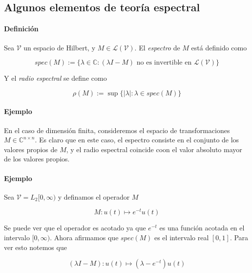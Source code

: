 \subsection{Algunos elementos de teoría espectral}

\paragraph{Definición} Sea $\mathcal{V}$ un espacio de Hilbert, y $M \in \mathcal{L} (\mathcal{V})$. El \textit{espectro} de $M$ está definido como

\begin{equation*}
    spec(M) := \{\lambda \in \mathbb{C} : (\lambda I - M) \text{ no es invertible en } \mathcal{L} (\mathcal{V}) \}
\end{equation*}

Y el \textit{radio espectral} se define como

\begin{equation*}
    \rho (M) := \sup \{ |\lambda | : \lambda \in spec(M) \}
\end{equation*}

\paragraph{Ejemplo} En el caso de dimensión finita, consideremos el espacio de transformaciones $M \in \mathbb{C}^{n \times n}$. Es claro que en este caso, el espectro consiste en el conjunto de los valores propios de $M$, y el radio espectral coincide coon el valor absoluto mayor de los valores propios.


\paragraph{Ejemplo} Sea $\mathcal{V} = L_2[0,\infty)$ y definamos el operador $M$

\begin{equation*}
    M : u(t) \mapsto e^{-t} u(t)
\end{equation*}

Se puede ver que el operador es acotado ya que $e^{-t}$ es una función acotada en el intervalo $[0,\infty)$. Ahora afirmamos que $spec(M)$ es el intervalo real $[0,1]$. Para ver esto notemos que

\begin{equation*}
    (\lambda I - M) : u(t) \mapsto (\lambda - e^{-t}) u(t)
\end{equation*}

